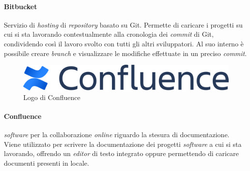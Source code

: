 \paragraph{Bitbucket} Servizio di \textit{hosting} di \textit{repository} basato su Git. Permette di caricare i progetti su cui si sta lavorando contestualmente alla cronologia dei \textit{commit} di Git, condividendo così il lavoro svolto con tutti gli altri sviluppatori. Al suo interno è possibile creare \textit{branch} e visualizzare le modifiche effettuate in un preciso \textit{commit}.

\vspace{6mm}

\begin{figure}[H]
    \centering 
    \includegraphics[width=0.4\columnwidth]{images/loghi/confluence.png} 
    \caption{Logo di Confluence}
\end{figure}

\paragraph{Confluence} \textit{software} per la collaborazione \textit{online} riguardo la stesura di documentazione. Viene utilizzato per scrivere la documentazione dei progetti \textit{software} a cui si sta lavorando, offrendo un \textit{editor} di testo integrato oppure permettendo di caricare documenti presenti in locale.


